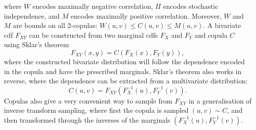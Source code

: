 \documentclass{juliacon}
\begin{document}
\noindent where $W$ encodes maximally negative correlation, $\Pi$ encodes stochastic independence, and $M$ encodes maximally positive correlation. Moreover, $W$ and $M$ are bounds on all 2-copulas: $W(u,v) \leq C(u,v) \leq M(u,v)$. A bivariate cdf $F_{XY}$ can be constructed from two marginal cdfs $F_{X}$ and $F_{Y}$ and copula $C$ using Sklar's theorem
\begin{equation*}
  F_{XY}(x,y) = C(F_{X}(x), F_{Y}(y)),
\end{equation*}
\noindent where the constructed bivariate distribution will follow the dependence encoded in the copula and have the prescribed marginals. Sklar's theorem also works in reverse, where the dependence can be extracted from a multivariate distribution: 
\begin{equation*}
  C(u,v) = F_{XY}(F^{-1}_{X}(u), F^{-1}_{Y}(v)).
\end{equation*}
\noindent Copulas also give a very convenient way to sample from $F_{XY}$ in a generalisation of inverse transform sampling, where first the copula is sampled $(u,v) \sim C$, and then transformed through the inverses of the marginals $(F^{-1}_{X}(u), F^{-1}_{Y}(v))$.
\end{document}
